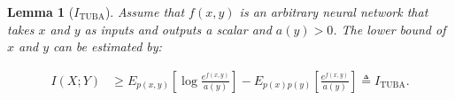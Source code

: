 \documentclass[11pt]{article}
\newtheorem{lemma}{Lemma}
\begin{document}
\begin{lemma}
[$I_{\text{TUBA}}$]
Assume that $f(x,y)$ is an arbitrary neural network that takes $x$ and $y$ as inputs and outputs a scalar and $a(y)>0$. The lower bound of $x$ and $y$ can be estimated by:
\begin{small}
\begin{equation*}
\begin{aligned}
    I (X;Y) &\geq E_{p(x,y)}[ \log \frac{e^{f(x,y)}}{a(y)}] - E_{p(x)p(y)}[\frac{e^{f(x,y)}}{a(y)}] \triangleq I_{\text{TUBA}}.
\end{aligned}
\end{equation*}
\end{small}
\label{lemma:tuba}
\end{lemma}

\end{document}
